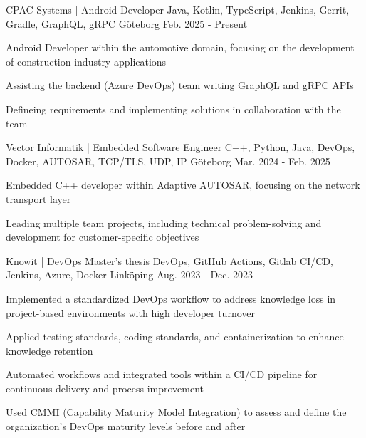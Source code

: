 

\begin{cventries}

\cventry
{CPAC Systems | Android Developer} %
{Java, Kotlin, TypeScript, Jenkins, Gerrit, Gradle, GraphQL, gRPC} %
{Göteborg} %
{Feb. 2025 - Present} %
{
  \begin{cvitems} %
    \item {Android Developer within the automotive domain, focusing on the development of construction industry applications}
    \item {Assisting the backend (Azure DevOps) team writing GraphQL and gRPC APIs}
    \item {Defineing requirements and implementing solutions in collaboration with the team}
  \end{cvitems}
}
  \cventry
    {Vector Informatik | Embedded Software Engineer} %
    {C++, Python, Java, DevOps, Docker, AUTOSAR, TCP/TLS, UDP, IP} %
    {Göteborg} %
    {Mar. 2024 - Feb. 2025} %
    {
      \begin{cvitems} %
        \item {Embedded C++ developer within Adaptive AUTOSAR, focusing on the network transport layer}
        \item {Leading multiple team projects, including technical problem-solving and development for customer-specific objectives}
      \end{cvitems}
    }

   \cventry
    {Knowit | DevOps Master's thesis} %
    {DevOps, GitHub Actions, Gitlab CI/CD, Jenkins, Azure, Docker} %
    {Linköping} %
    {Aug. 2023 - Dec. 2023} %
    {
      \begin{cvitems} %
        \item {Implemented a standardized DevOps workflow to address knowledge loss in project-based environments with high developer turnover}
        \item {Applied testing standards, coding standards, and containerization to enhance knowledge retention}
        \item {Automated workflows and integrated tools within a CI/CD pipeline for continuous delivery and process improvement}
        \item {Used CMMI (Capability Maturity Model Integration) to assess and define the organization’s DevOps maturity levels before and after}
      \end{cvitems}
    }


\end{cventries}
